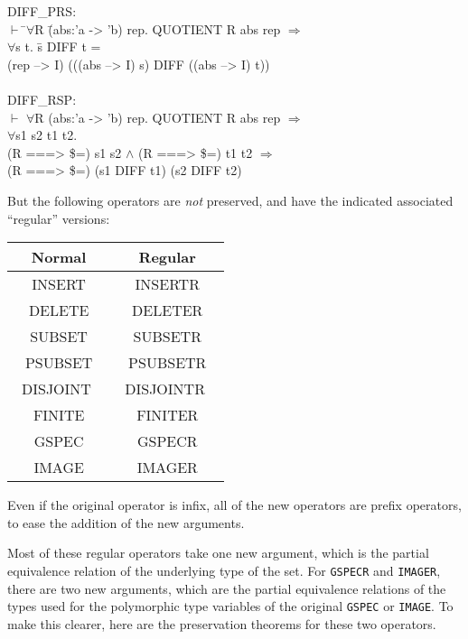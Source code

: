 \documentclass[envcountsame,runningheads]{llncs}
\begin{document}
{\tt \begin{tabbing}
DIFF\_PRS: \\
\hspace{5.5mm}
    $\vdash$ \=$\forall$R \=(abs:'a -> 'b) rep. QUOTIENT R abs rep $\Rightarrow$ \\
\>\>     $\forall$s t. \=s DIFF t = \\
\>\>\>     (rep --> I) (((abs --> I) s) DIFF ((abs --> I) t)) \\
\\
DIFF\_RSP: \\
\hspace{5.5mm}
    $\vdash$ $\forall$R (abs:'a -> 'b) rep. QUOTIENT R abs rep $\Rightarrow$ \\
\>\>     $\forall$s1 s2 t1 t2. \\
\>\>\>     (R ===> \$=) s1 s2 $\wedge$ (R ===> \$=) t1 t2 $\Rightarrow$ \\
\>\>\>     (R ===> \$=) (s1 DIFF t1) (s2 DIFF t2)
\end{tabbing}}

But  the following operators are {\it not\/} preserved, and have the indicated
associated ``regular'' versions:

\begin{center}
{\tt \begin{tabular}{|c|c|}
\hline
{\rm Normal} & {\rm Regular} \\
\hline
INSERT   & INSERTR \\
DELETE   & DELETER  \\
SUBSET   & SUBSETR \\
PSUBSET  & PSUBSETR \\
\ DISJOINT \ & \ DISJOINTR \  \\
FINITE   & FINITER  \\
GSPEC    & GSPECR  \\
IMAGE    & IMAGER  \\
\hline
\end{tabular}}
\end{center}

Even if the original operator is infix, all of the new operators
are prefix operators, to ease the addition of the new arguments.

Most of these regular operators take one new argument, which is the
partial equivalence relation of the underlying type of the set.
For {\tt GSPECR} and {\tt IMAGER}, there are two new arguments,
which are the partial equivalence relations of 
the types used for the polymorphic type variables of the original
{\tt GSPEC} or {\tt IMAGE}.  To make this clearer, here are the
preservation theorems for these two operators.
\end{document}
